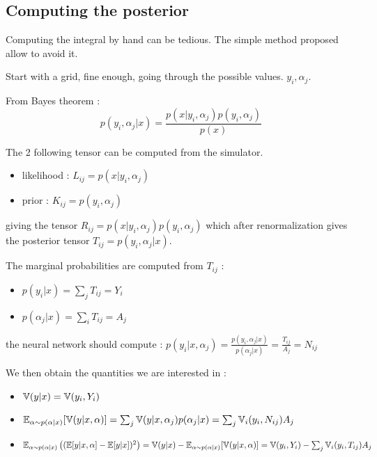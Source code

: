 \subsection{Computing the posterior} %
\label{sub:computing_the_posterior}


Computing the integral by hand can be tedious.
The simple method proposed allow to avoid it.

Start with a grid, fine enough, going through the possible values. $y_i, \alpha_j$.

From Bayes theorem : 
$$
    p(y_i, \alpha_j | x) = \frac{p(x|y_i, \alpha_j) p(y_i, \alpha_j)}{p(x)}
$$

The 2 following tensor can be computed from the simulator.
\begin{itemize}
  \item likelihood : $L_{ij} = p(x|y_i, \alpha_j)$
  \item prior : $K_{ij} = p(y_i, \alpha_j)$ 
\end{itemize}

giving the tensor $ R_{ij} = p(x|y_i, \alpha_j) p(y_i, \alpha_j) $ 
which after renormalization gives the posterior tensor $ T_{ij} = p(y_i, \alpha_j | x)$.

The marginal probabilities are computed from $T_{ij}$ :
\begin{itemize}
  \item $p(y_i | x) = \sum_j T_{ij} = Y_i$
  \item $p(\alpha_j | x) = \sum_i T_{ij} = A_j$
\end{itemize}

the neural network should compute : $p(y_i | x, \alpha_j) = \frac{p(y_i, \alpha_j | x)}{p(\alpha_j | x)} = \frac{T_{ij}}{A_j} = N_{ij}$

We then obtain the quantities we are interested in :
\begin{itemize}
  \item $ \mathbb{V}(y|x) = \mathbb{V}(y_i, Y_i) $
  \item $ \mathbb{E}_{\alpha \sim p(\alpha|x)}[ \mathbb{V}(y|x, \alpha) ] = \sum_j \mathbb{V}(y|x, \alpha_j) p(\alpha_j | x) = \sum_j \mathbb{V}_i(y_i, N_{ij}) A_j$
  \item $\mathbb{E}_{\alpha \sim p(\alpha|x)} \left ((\mathbb{E} [y|x, \alpha]  - \mathbb{E}[y|x])^2\right ) = \mathbb{V}(y|x) - \mathbb{E}_{\alpha \sim p(\alpha|x)}[ \mathbb{V}(y|x, \alpha) ] = \mathbb{V}(y_i, Y_i) - \sum_j \mathbb{V}_i(y_i, T_{ij}) A_j$
\end{itemize}


